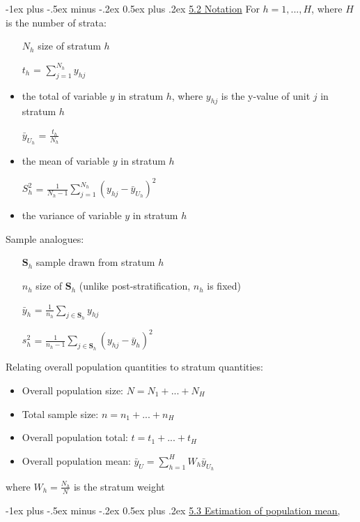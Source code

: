 \documentclass[10pt,landscape]{article}
\makeatletter
\renewcommand{\section}{\@startsection{section}{1}{0mm}%
                                {-1ex plus -.5ex minus -.2ex}%
                                {0.5ex plus .2ex}%
                                {\normalfont\large\bfseries}}
\makeatother
\begin{document}
\begin{multicols}{3}
\section{\underline{5.2 Notation}}
For $h = 1,...,H$, where $H$ is the number of strata:
\begin{itemize}
  \item[$N_{h}$] size of stratum $h$
  \item[$t_{h}$] = $\sum_{j=1}^{N_{h}}y_{hj}$
  \item the total of variable $y$ in stratum $h$, where $y_{hj}$ is the y-value of unit $j$ in stratum $h$
  \item[$\bar{y}_{U_{h}}$] = $\frac{t_{h}}{N_{h}}$
  \item the mean of variable $y$ in stratum $h$
  \item[$S^{2}_{h}$] = $\frac{1}{N_{h} - 1}\sum_{j=1}^{N_{h}}(y_{hj} - \bar{y}_{U_{h}})^{2}$
  \item the variance of variable $y$ in stratum $h$
\end{itemize}

Sample analogues:
\begin{itemize}
  \item[$\textbf{S}_{h}$] sample drawn from stratum $h$
  \item[$n_{h}$] size of $\textbf{S}_{h}$ (unlike post-stratification, $n_{h}$ is fixed)
  \item[$\bar{y}_{h}$] = $\frac{1}{n_{h}}\sum_{j \in \textbf{S}_{h}}y_{hj}$
  \item[$s_{h}^{2}$] = $\frac{1}{n_{h} - 1}\sum_{j \in \textbf{S}_{h}}(y_{hj} - \bar{y}_{h})^{2}$
\end{itemize}

Relating overall population quantities to stratum quantities:

\begin{itemize}
  \item Overall population size: $N=N_{1}+...+N_{H}$
  \item Total sample size: $n=n_{1}+...+n_{H}$
  \item Overall population total: $t=t_{1}+...+t_{H}$
  \item Overall population mean: $\bar{y}_{U} = \sum_{h=1}^{H}W_{h}\bar{y}_{U_{h}}$
\end{itemize}

where $W_{h} = \frac{N_{h}}{N}$ is the stratum weight

\section{\underline{5.3 Estimation of population mean,}}

\end{multicols}
\end{document}
